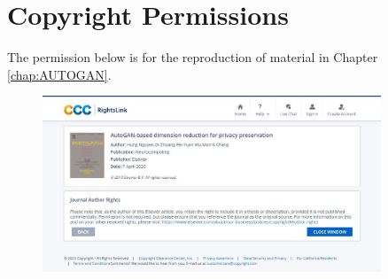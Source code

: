 
\chapter{Copyright Permissions}\label{cp:apex}
The permission below is for the reproduction of material in Chapter \ref{chap:AUTOGAN}.
\begin{figure}[!ht]
	\centering
    \includegraphics[width=0.9\textwidth]{Figures/copyright}
	\label{copyright1}
\end{figure} 

